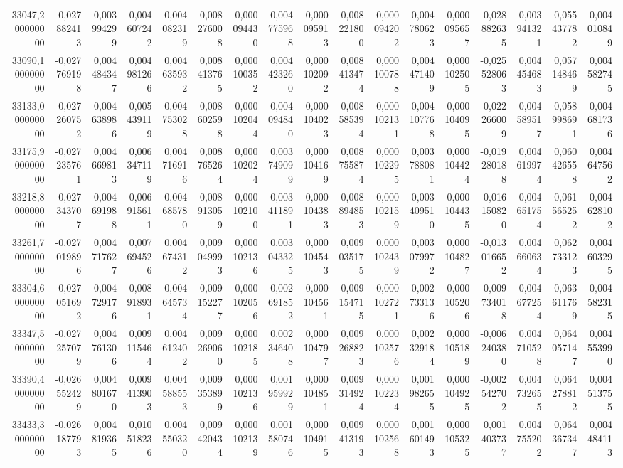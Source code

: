 \begin{longtable}{rrrrrrrrrrrrrrrrr}
33047,200000000 & -0,027882413 & 0,003994299 & 0,004607242 & 0,004082319 & 0,008276008 & 0,000094430 & 0,004775968 & 0,000095913 & 0,008221800 & 0,000094202 & 0,004780623 & 0,000095657 & -0,028882635 & 0,003941321 & 0,055437782 & 0,004010849\\
33090,100000000 & -0,027769198 & 0,004484347 & 0,004981266 & 0,004635932 & 0,008413765 & 0,000100352 & 0,004423260 & 0,000102092 & 0,008413474 & 0,000100788 & 0,004471409 & 0,000102505 & -0,025528063 & 0,004454683 & 0,057148469 & 0,004582745\\
33133,000000000 & -0,027260752 & 0,004638986 & 0,005439119 & 0,004753028 & 0,008602598 & 0,000102044 & 0,004094840 & 0,000104023 & 0,008585394 & 0,000102131 & 0,004107768 & 0,000104095 & -0,022266009 & 0,004589517 & 0,058998691 & 0,004681736\\
33175,900000000 & -0,027235761 & 0,004669813 & 0,006347119 & 0,004716916 & 0,008765264 & 0,000102024 & 0,003749099 & 0,000104169 & 0,008755874 & 0,000102295 & 0,003788081 & 0,000104424 & -0,019280188 & 0,004619974 & 0,060426558 & 0,004647562\\
33218,800000000 & -0,027343707 & 0,004691988 & 0,006915611 & 0,004685780 & 0,008913059 & 0,000102100 & 0,003411891 & 0,000104383 & 0,008894853 & 0,000102159 & 0,003409510 & 0,000104435 & -0,016150820 & 0,004651754 & 0,061565252 & 0,004628102\\
33261,700000000 & -0,027019896 & 0,004717627 & 0,007694526 & 0,004674312 & 0,009049993 & 0,000102136 & 0,003043325 & 0,000104543 & 0,009035175 & 0,000102439 & 0,003079972 & 0,000104827 & -0,013016652 & 0,004660634 & 0,062733123 & 0,004603295\\
33304,600000000 & -0,027051692 & 0,004729176 & 0,008918931 & 0,004645734 & 0,009152277 & 0,000102056 & 0,002691852 & 0,000104561 & 0,009154715 & 0,000102721 & 0,002733136 & 0,000105206 & -0,009734018 & 0,004677254 & 0,063611769 & 0,004582315\\
33347,500000000 & -0,027257079 & 0,004761306 & 0,009115464 & 0,004612402 & 0,009269060 & 0,000102185 & 0,002346408 & 0,000104797 & 0,009268823 & 0,000102576 & 0,002329184 & 0,000105189 & -0,006240380 & 0,004710528 & 0,064057147 & 0,004553990\\
33390,400000000 & -0,026552429 & 0,004801670 & 0,009413903 & 0,004588553 & 0,009353899 & 0,000102136 & 0,001959929 & 0,000104851 & 0,009314924 & 0,000102234 & 0,001982655 & 0,000104925 & -0,002542702 & 0,004732655 & 0,064278812 & 0,004513755\\
33433,300000000 & -0,026187793 & 0,004819365 & 0,010518236 & 0,004550320 & 0,009420434 & 0,000102139 & 0,001580746 & 0,000104915 & 0,009413193 & 0,000102568 & 0,001601493 & 0,000105325 & 0,001403737 & 0,004755202 & 0,064367347 & 0,004484113\\

\end{longtable}
